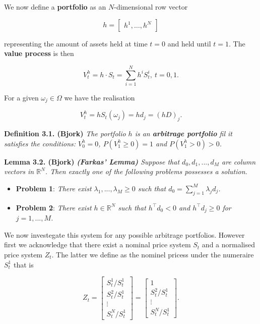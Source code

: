 \documentclass[
]{book}
\providecommand{\tightlist}{%
  \setlength{\itemsep}{0pt}\setlength{\parskip}{0pt}}
\begin{document}
We now define a \textbf{portfolio} as an \(N\)-dimensional row vector

\[
h=\begin{bmatrix} h^1, \dots,h^N\end{bmatrix}
\]

representing the amount of assets held at time \(t=0\) and held until \(t=1\). The \textbf{value process} is then

\[
V^h_t=h\cdot S_t=\sum_{i=1}^N h^iS_t^i,\ t=0,1.\tag{3.1}
\]

For a given \(\omega_j\in\Omega\) we have the realisation

\[
V_t^h=hS_t(\omega_j)=hd_j=(hD)_j.
\]

\textbf{Definition 3.1. (Bjork)} \emph{The portfolio \(h\) is an \textbf{arbitrage portfolio} fil it satisfies the conditions: \(V_0^h=0\), \(P(V_1^h\ge 0)=1\) and \(P(V_1^h>0)>0\).}

\textbf{Lemma 3.2. (Bjork)} \emph{\textbf{(Farkas' Lemma)} Suppose that \(d_0,d_1,...,d_M\) are column vectors in \(\mathbb{R}^N\). Then exactly one of the following problems possesses a solution.}

\begin{itemize}
\tightlist
\item
  \textbf{Problem 1}: \emph{There exist \(\lambda_1,...,\lambda_M\ge0\) such that \(d_0=\sum_{j=1}^M\lambda_jd_j\).}
\item
  \textbf{Problem 2}: \emph{There exist \(h\in\mathbb{R}^N\) such that \(h^\top d_0<0\) and \(h^\top d_j\ge 0\) for \(j=1,...,M\).}
\end{itemize}

We now investegate this system for any possible arbitrage portfolios. However first we acknowledge that there exist a nominal price system \(S_t\) and a normalised price system \(Z_t\). The latter we define as the nominel pricess under the numeraire \(S_t^1\) that is

\[
Z_t=\begin{bmatrix} S_t^1/S_t^1\\
S_t^2/S_t^1\\
\vdots\\
S_t^N/S_t^1\end{bmatrix}=\begin{bmatrix} 1\\
S_t^2/S_t^1\\
\vdots\\
S_t^N/S_t^1\end{bmatrix}.
\]
\end{document}
